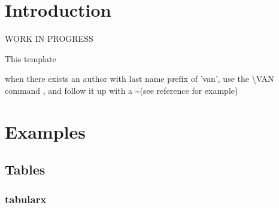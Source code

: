 \chapter{Introduction}

WORK IN PROGRESS

This template 

when there exists an author with last name prefix of 'van', use the \textbackslash VAN command , and follow it up with a \textasciitilde (see reference for example)


\citet*{Allen2002}

\citet*{Bettini2021}

\citet*{Eitelberg2020}

\citet*{Sinnige2020}

\citet*{Herrez2016}


\chapter{Examples}

\section{Tables}

\subsection{tabularx}

\begingroup
\renewcommand\tabularxcolumn[1]{m{#1}} %

